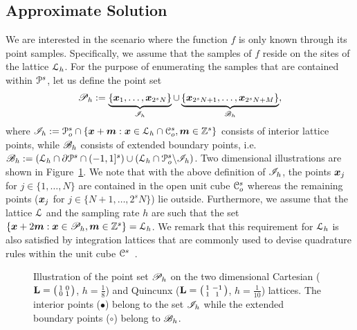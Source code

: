 \subsection{Approximate Solution}
We are interested in the scenario where the function $f$ is only known
through its point samples. Specifically, we assume that the samples of
$f$ reside on the sites of the lattice $\mathcal{L}_h$. For the
purpose of enumerating the samples that are contained within
$\mathcal{P}^s$, let us define the point set
\begin{equation}
  \mathscr{P}_h := \underbrace{\{\boldsymbol{x}_1,\ldots,\boldsymbol{x}_{2^sN} \}}_{\mathscr{I}_h}
  \cup
\underbrace{\{\boldsymbol{x}_{2^sN + 1},\ldots,\boldsymbol{x}_{2^sN + M} \}}_{\mathscr{B}_h},
\end{equation}
where $\mathscr{I}_h := \mathcal{P}_o^s \cap \{\boldsymbol{x} + \boldsymbol{m} :
\boldsymbol{x} \in \mathcal{L}_h \cap \mathcal{C}_o^s, \boldsymbol{m} \in \mathbb{Z}^s \}$
consists of interior lattice points, while $\mathscr{B}_h$ consists
of extended boundary points, i.e. $\mathscr{B}_h := (\mathcal{L}_h
\cap \partial\mathcal{P}^s \cap (-1,1]^s) \cup (\mathcal{L}_h \cap
\mathcal{P}_o^s\backslash \mathscr{I}_h)$. Two dimensional illustrations are
shown in Figure~\ref{fig:pointset}. We note that with the above
definition of $\mathscr{I}_h$, the points $\boldsymbol{x}_j$ for $j \in
\{1, \ldots, N\}$ are contained in the open unit cube $\mathcal{C}_o^s$
whereas the remaining points ($\boldsymbol{x}_j$ for $j \in \{N+1, \ldots,
2^sN\}$) lie outside. Furthermore, we assume
that the lattice $\mathcal{L}$ and the sampling rate $h$ are such that
the set $\{\boldsymbol{x} + 2\boldsymbol{m} : \boldsymbol{x} \in \mathscr{P}_h,
\boldsymbol{m} \in \mathbb{Z}^s\} = \mathcal{L}_h$. We remark that this
requirement for $\mathcal{L}_h$ is also
satisfied by integration lattices that are commonly used
to devise quadrature rules within the unit cube $\mathcal{C}^s$~\cite{nied92}.
\begin{figure}[t]
  \centering
  \subfloat[Cartesian]{\label{fig:cartesian}}
  \hspace{2em}
  \subfloat[Quincunx]{\label{fig:quincunx}}
  \caption[Interior and boundary samples]{Illustration of the point set
  $\mathscr{P}_h$ on the two
    dimensional Cartesian ($\mathbf{L} = \bigl( \begin{smallmatrix} 1&0\\
      0&1
    \end{smallmatrix} \bigr)$, $h=\tfrac{1}{8}$) and Quincunx ($\mathbf{L} = \bigl(
    \begin{smallmatrix} 1&-1\\
      1&1
    \end{smallmatrix} \bigr)$, $h=\tfrac{1}{10}$) lattices. The interior points
    ($\bullet$) belong to the set $\mathscr{I}_h$ while the extended
    boundary points ($\circ$) belong to $\mathscr{B}_h$.}
  \label{fig:pointset}
\end{figure}

